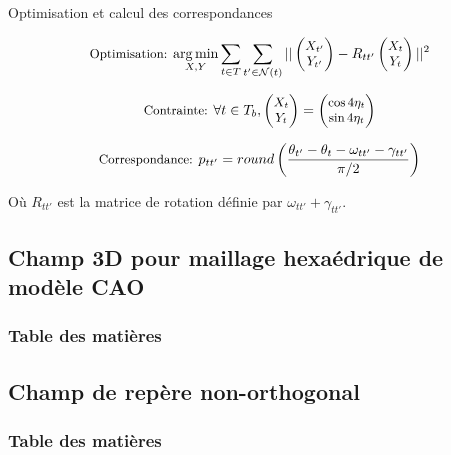 \documentclass{beamer}
\DeclareMathOperator*{\argmin}{arg\,min}
\begin{document}
\begin{frame}{Optimisation et calcul des correspondances}

    
    \[\small
    \text{Optimisation: } \underset{X, Y}{\argmin} \sum_{t \in T}\sum_{t' \in \mathcal{N}(t)} ||\begin{pmatrix} X_{t'}\\ Y_{t'}\end{pmatrix} - R_{tt'}\begin{pmatrix} X_{t}\\ Y_{t}\end{pmatrix} ||^2
    \]
    
    \[\small
    \text{Contrainte: } \forall t \in T_b, \begin{pmatrix} X_{t}\\ Y_{t}\end{pmatrix} = \begin{pmatrix} \cos4\eta_t\\ \sin4\eta_t\end{pmatrix}
    \]
    
    \[\small
    \text{Correspondance: } p_{tt'} = round\left(\frac{\theta_{t'} - \theta_t - \omega_{tt'} - \gamma_{tt'}}{\pi/2}\right)
    \]
    
    Où $R_{tt'}$ est la matrice de rotation définie par $\omega_{tt'} + \gamma_{tt'}$.
    
\end{frame}

\subsection{Champ 3D pour maillage hexaédrique de modèle CAO}
\begin{frame}
    \frametitle{Table des matières}
    \tableofcontents[currentsubsection, sectionstyle=show/shaded, subsectionstyle=show/shaded/hide]
\end{frame}
\subsection{Champ de repère non-orthogonal}
\begin{frame}
    \frametitle{Table des matières}
    \tableofcontents[currentsubsection, sectionstyle=show/shaded, subsectionstyle=show/shaded/hide]
\end{frame}
\end{document}
